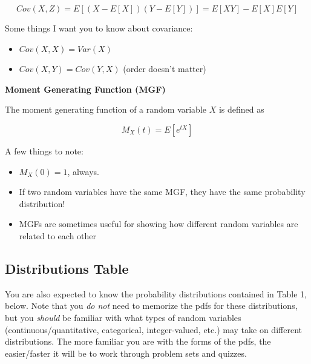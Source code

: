 \documentclass[
  letterpaper,
  DIV=11,
  numbers=noendperiod]{scrreprt}
\begin{document}
\[
Cov(X, Z) = E[(X - E[X])(Y - E[Y])] = E[XY] - E[X]E[Y]
\]

Some things I want you to know about covariance:

\begin{itemize}
\item
  \(Cov(X, X) = Var(X)\)
\item
  \(Cov(X, Y) = Cov(Y, X)\) (order doesn't matter)
\end{itemize}

\textbf{Moment Generating Function (MGF)}

The moment generating function of a random variable \(X\) is defined as

\[
M_X(t) = E[e^{tX}]
\]

A few things to note:

\begin{itemize}
\item
  \(M_X(0) = 1\), always.
\item
  If two random variables have the same MGF, they have the same
  probability distribution!
\item
  MGFs are sometimes useful for showing how different random variables
  are related to each other
\end{itemize}

\subsection{Distributions Table}\label{distributions-table}

You are also expected to know the probability distributions contained in
Table 1, below. Note that you \emph{do not} need to memorize the pdfs
for these distributions, but you \emph{should} be familiar with what
types of random variables (continuous/quantitative, categorical,
integer-valued, etc.) may take on different distributions. The more
familiar you are with the forms of the pdfs, the easier/faster it will
be to work through problem sets and quizzes.
\end{document}
